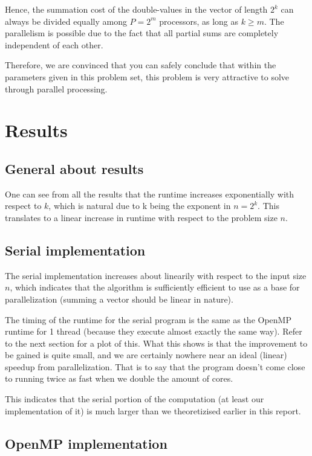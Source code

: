 \documentclass[fontsize=11pt,paper=a4,titlepage]{report}
\begin{document}
Hence, the summation cost of the double-values in the vector of length $2^k$ can
always be divided equally among $P = 2^m$ processors, as long as $k\geq m$. The
parallelism is possible due to the fact that all partial sums are completely
independent of each other.

Therefore, we are convinced that you can safely conclude that within the
parameters given in this problem set, this problem is very attractive to solve
through parallel processing.

\section{Results}

\subsection{General about results}
One can see from all the results that the runtime increases exponentially with
respect to $k$, which is natural due to k being the exponent in $n=2^k$. This
translates to a linear increase in runtime with respect to the problem size $n$.

\subsection{Serial implementation}

The serial implementation increases about linearily with respect to the input
size $n$, which indicates that the algorithm is sufficiently efficient to use as a
base for parallelization (summing a vector should be linear in nature).

The timing of the runtime for the serial program is the same as the OpenMP
runtime for 1 thread (because they execute almost exactly the same way). Refer
to the next section for a plot of this. What this shows is that the improvement
to be gained is quite small, and we are certainly nowhere near an ideal (linear)
speedup from parallelization. That is to say that the program doesn't come close
to running twice as fast when we double the amount of cores.

This indicates that the serial portion of the computation (at least our
implementation of it) is much larger than we theoretizised earlier in this
report.

\clearpage
\subsection{OpenMP implementation}
\end{document}
